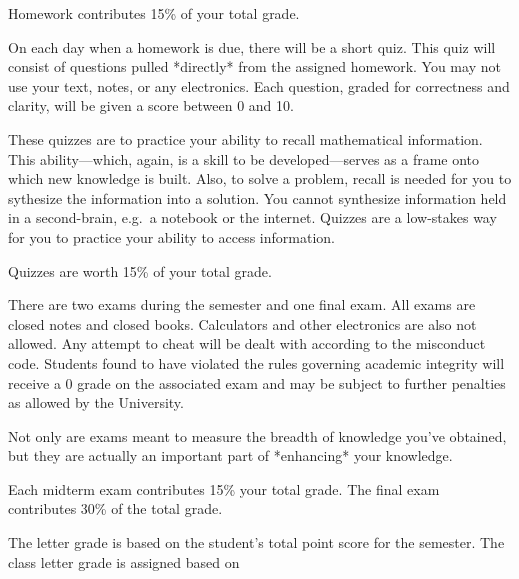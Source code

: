 \documentclass{assets/syllabus}
\begin{document}
Homework contributes 15\% of your total grade.



On each day when a homework is due, there will be
a short quiz. This quiz will consist of questions
pulled *directly* from the assigned homework. You
may not use your text, notes, or any
electronics. Each question, graded for correctness
and clarity, will be given a score between 0 and
10.

These quizzes are to practice your ability to
recall mathematical information. This
ability---which, again, is a skill to be
developed---serves as a frame onto which new
knowledge is built.  Also, to solve a problem,
recall is needed for you to sythesize the
information into a solution.  You cannot
synthesize information held in a second-brain,
e.g.~a notebook or the internet. Quizzes are a
low-stakes way for you to practice your ability to
access information.

Quizzes are worth 15\% of your total grade.


There are two exams during the semester and one
final exam. All exams are closed notes and closed
books. Calculators and other electronics are also
not allowed. Any attempt to cheat will be dealt
with according to the misconduct code.  Students
found to have violated the rules governing
academic integrity will receive a 0 grade on the
associated exam and may be subject to further
penalties as allowed by the University.

Not only are exams meant to measure the breadth of
knowledge you've obtained, but they are actually
an important part of *enhancing* your knowledge.

Each midterm exam contributes 15\% your total
grade.  The final exam contributes 30\% of the
total grade.



The letter grade is based on the student's total
point score for the semester.  The class letter
grade is assigned based on
\end{document}
